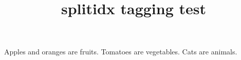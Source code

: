 \documentclass{article}
\title{splitidx tagging test}
\begin{document}
Apples
and oranges
are fruits.
Tomatoes
are
vegetables.
Cats
are animals.
\printindex*
\end{document}
